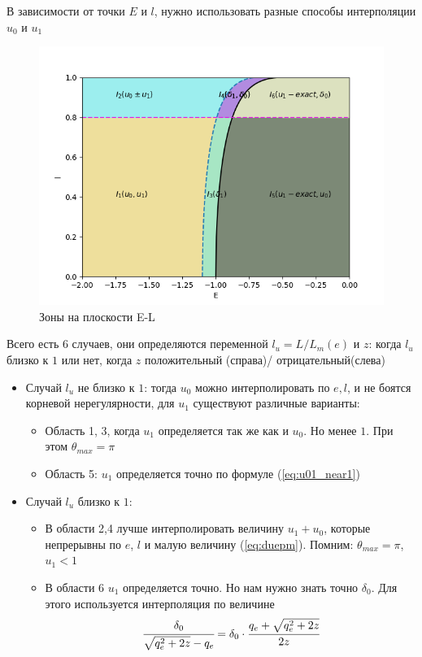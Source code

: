 	В зависимости от точки $E$ и $l$, нужно использовать разные способы интерполяции $u_0$ и $u_1$
	\begin{figure}[!h]
		\begin{center}
			\includegraphics[scale=0.9]{imags/diagramm1.png}
		\end{center}
		\caption{Зоны на плоскости E-L}
		\label{diagramm1:Tex}
	\end{figure}
	
	Всего есть 6 случаев, они определяются переменной $l_u = L/L_m(e)$ и $z$: когда $l_u$ близко к $1$ или нет, когда $z$ положительный (справа)/ отрицательный(слева)
	\begin{itemize}
		\item Случай $l_u$ не близко к $1$: тогда $u_0$ можно интерполировать по $e,l$, и не боятся корневой нерегулярности, для $u_1$ существуют различные варианты:
		\begin{itemize}
			\item Область 1, 3, когда $u_1$ определяется так же как и $u_0$. Но менее $1$. 
			При этом $\theta_{max} = \pi$
			\item Область 5: $u_1$ определяется точно по формуле (\ref{eq:u01_near1})
		\end{itemize}
		\item Случай $l_u$ близко к $1$:
		\begin{itemize}
			\item В области 2,4 лучше интерполировать величину $u_1 + u_0$, которые непрерывны по $e$, $l$ и малую величину (\ref{eq:duepm}). Помним: $\theta_{max} = \pi$, $u_1<1$ 
			\item В области 6 $u_1$ определяется точно. Но нам нужно знать точно $\delta_0$. Для этого используется интерполяция по величине 
			\begin{equation*}
				\cfrac{\delta_0}{\sqrt{q_e^2+2z} - q_e} = 
				\delta_0\cdot\cfrac{q_e+\sqrt{q_e^2+2z}}{2z}
			\end{equation*}
		\end{itemize}
	\end{itemize}
	
